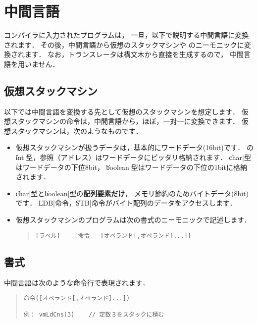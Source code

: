% 
%
\chapter{中間言語}
\label{app:vm}

\cmm コンパイラに入力された\cmm プログラムは，
一旦，以下で説明する中間言語に変換されます．
その後，中間言語から仮想のスタックマシンや
\tac のニーモニックに変換されます．
なお，{\cl}トランスレータは構文木から直接{\cl}を生成するので，
中間言語を用いません．

\section{仮想スタックマシン}

以下では中間言語を変換する先として仮想のスタックマシンを想定します．
仮想スタックマシンの命令は，中間言語から，ほぼ，一対一に変換できます．
仮想スタックマシンは，次のようなものです．

\begin{itemize}
\item 
仮想スタックマシンが扱うデータは，基本的にワードデータ(16bit)です．
{\cmml}の\|int|型，参照（アドレス）はワードデータにピッタリ格納されます．
\|char|型はワードデータの下位8bit，
\|boolean|型はワードデータの下位の1bitに格納されます．

\item
\|char|型と\|boolean|型の{\bf 配列要素だけ}，
メモリ節約のためバイトデータ(8bit)です．
\|LDB|命令，\|STB|命令がバイト配列のデータをアクセスします．

\item
仮想スタックマシンのプログラムは次の書式のニーモニックで記述します．

\begin{quote}
\begin{verbatim}
[ラベル]    [命令   [オペランド[,オペランド]...]]
\end{verbatim}
\end{quote}

\end{itemize}

\section{書式}

中間言語は次のような命令行で表現されます．

\begin{quote}
\begin{verbatim}
命令([オペランド[,オペランド]...])

例： vmLdCns(3)    // 定数３をスタックに積む
\end{verbatim}
\end{quote}

